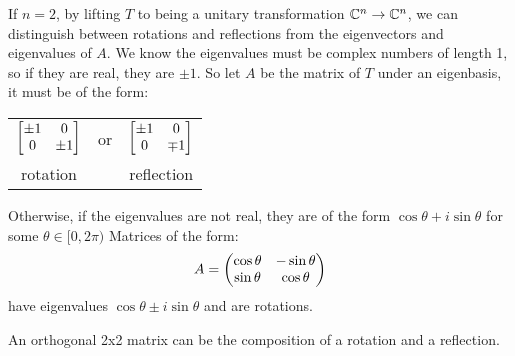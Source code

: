 \begin{remark}
  If $n=2$, by lifting $T$ to being a unitary transformation $\mathbb{C}^n \to \mathbb{C}^n$,
  we can distinguish between rotations and reflections from the eigenvectors and eigenvalues of $A$.
  We know the eigenvalues must be complex numbers of length 1, so if they are real, they are $\pm 1$.
  So let $A$ be the matrix of $T$ under an eigenbasis, it must be of the form:
    \begin{center}
      \begin{tabular}{c c c}
        $\begin{bmatrix}
          \pm 1 & 0 \\
          0 & \pm 1
        \end{bmatrix}$ & or & $\begin{bmatrix}
          \pm 1 & 0 \\
          0 & \mp 1
        \end{bmatrix}$ \\
        rotation & & reflection
      \end{tabular}
    \end{center}
  Otherwise, if the eigenvalues are not real, they are of the form $\cos \theta + i \sin \theta$ for some $\theta \in [0,2\pi)$
  Matrices of the form:
    $$A = \begin{pmatrix}\cos \theta & -\sin \theta \\ \sin \theta & \cos \theta\end{pmatrix}$$
  have eigenvalues $\cos \theta \pm i \sin \theta$ and are rotations.
\end{remark}
\begin{remark}
  An orthogonal 2x2 matrix can be the composition of a rotation and a reflection.
\end{remark}

